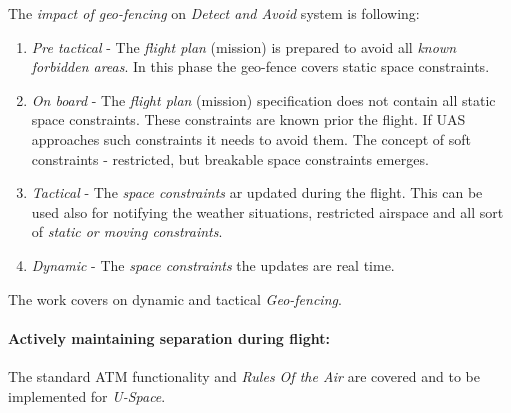 \newpage
\noindent The \emph{impact of geo-fencing} on \emph{Detect and Avoid} system is following:
\begin{enumerate}
    \item \emph{Pre tactical} - The \emph{flight plan} (mission) is prepared to avoid all \emph{known forbidden areas}. In this phase the geo-fence covers static space constraints.
    
    \item \emph{On board} - The \emph{flight plan} (mission) specification does not contain all static space constraints. These constraints are known prior the flight. If UAS approaches such constraints it needs to avoid them. The concept of soft constraints - restricted, but breakable space constraints emerges. 
    
    \item \emph{Tactical} - The \emph{space constraints} ar updated during the flight. This can be used also for notifying the weather situations, restricted airspace and all sort of \emph{static or moving constraints}.
    
    \item \emph{Dynamic} - The \emph{space constraints} the updates are real time.
\end{enumerate}

\begin{note}
    The work covers on dynamic and tactical \emph{Geo-fencing}.
\end{note}

\paragraph{Actively maintaining separation during flight:} The standard ATM functionality \cite{icao4444} and \emph{Rules Of the Air} \cite{icaoAnnex2,icaoAnnex11} are covered and to be implemented for \emph{U-Space}.